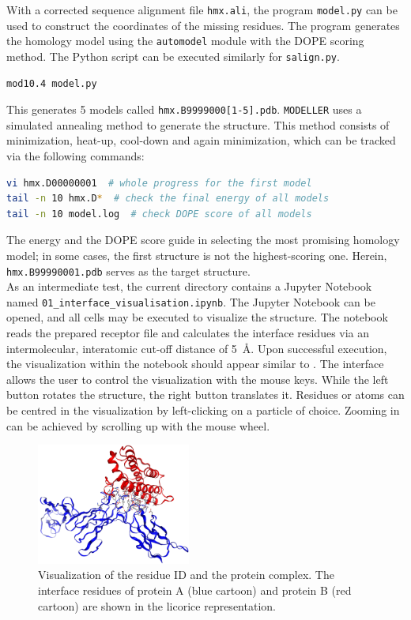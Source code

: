\documentclass[9pt,tutorial]{livecoms}
\newcommand{\code}[1]{\colorbox{light-gray}{\texttt{#1}}}
\begin{document}
With a corrected sequence alignment file \code{hmx.ali}, the program \code{model.py} can be used to construct the coordinates of the missing residues. The program generates the homology model using the \code{automodel} module with the DOPE scoring method. The Python script can be executed similarly for \code{salign.py}.
\begin{lstlisting}[language=bash]
mod10.4 model.py
\end{lstlisting}
This generates 5 models called \code{hmx.B9999000[1-5].pdb}. \texttt{MODELLER} uses a simulated annealing method to generate the structure. This method consists of minimization, heat-up, cool-down and again minimization, which can be tracked via the following commands:
\begin{lstlisting}[language=bash]
vi hmx.D00000001  # whole progress for the first model
tail -n 10 hmx.D*  # check the final energy of all models
tail -n 10 model.log  # check DOPE score of all models 
\end{lstlisting}
The energy and the DOPE score guide in selecting the most promising homology model; in some cases, the first structure is not the highest-scoring one. Herein, \code{hmx.B99990001.pdb} serves as the target structure.\\
As an intermediate test, the current directory contains a Jupyter Notebook named \code{01\_interface\_visualisation.ipynb}. The Jupyter Notebook can be opened, and all cells may be executed to visualize the structure. The notebook reads the prepared receptor file and calculates the interface residues via an intermolecular, interatomic cut-off distance of \SI{5}{\angstrom}. Upon successful execution, the visualization within the notebook should appear similar to . The interface allows the user to control the visualization with the mouse keys. While the left button rotates the structure, the right button translates it. Residues or atoms can be centred in the visualization by left-clicking on a particle of choice. Zooming in can be achieved by scrolling up with the mouse wheel.

\begin{figure}[H]
\centering
\includegraphics[width=0.45\textwidth]{figures/interface_residues_3hmx.png}
\caption{Visualization of the residue ID and the protein complex. The interface residues of protein A (blue cartoon) and protein B (red cartoon) are shown in the licorice representation.}
\label{fig:interface_residues_3hmx}
\end{figure}
\end{document}
